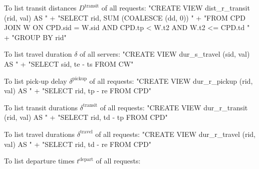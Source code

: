 \documentclass{article}
\def\nwendcode{\endtrivlist \endgroup}
\let\nwdocspar=\par
\theoremstyle{definition}
\begin{document}
To list transit distances $D^\textrm{transit}$ of all requests:
\nwenddocs{}\endmoddef{}
"CREATE VIEW dist_r_transit (rid, val) AS "
  + "SELECT rid, SUM (COALESCE (dd, 0)) "
  + "FROM CPD JOIN W ON CPD.sid = W.sid AND CPD.tp < W.t2 AND W.t2 <= CPD.td "
  + "GROUP BY rid"
\nwendcode{}\nwdocspar
To list travel duration $\delta$ of all servers:
\nwenddocs{}\endmoddef{}
"CREATE VIEW dur_s_travel (sid, val) AS "
  + "SELECT sid, te - ts FROM CW"
\nwendcode{}\nwdocspar
To list pick-up delay $\delta^\textrm{pickup}$ of all requests:
\nwenddocs{}\endmoddef{}
"CREATE VIEW dur_r_pickup (rid, val) AS "
  + "SELECT rid, tp - re FROM CPD"
\nwendcode{}\nwdocspar
To list transit durations $\delta^\textrm{transit}$ of all requests:
\nwenddocs{}\endmoddef{}
"CREATE VIEW dur_r_transit (rid, val) AS "
  + "SELECT rid, td - tp FROM CPD"
\nwendcode{}\nwdocspar
To list travel durations $\delta^\textrm{travel}$ of all requests:
\nwenddocs{}\endmoddef{}
"CREATE VIEW dur_r_travel (rid, val) AS "
  + "SELECT rid, td - re FROM CPD"
\nwendcode{}\nwdocspar
To list departure times $t^\textrm{depart}$ of all requests:
\end{document}
